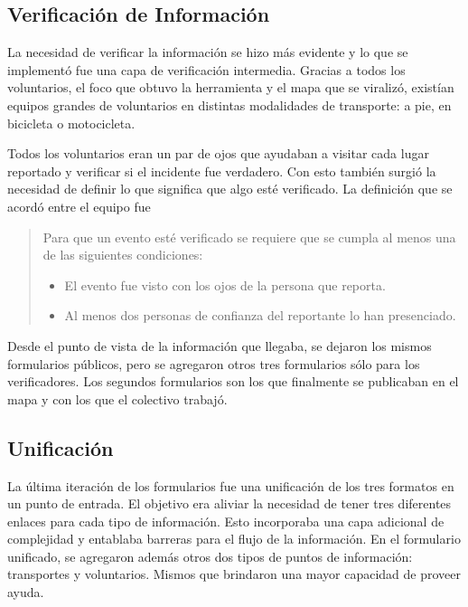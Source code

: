 \documentclass[12pt,spanish,oneside,breaklinks]{book}
\begin{document}
\subsection{Verificación de Información}
\label{sec:org77833d3}

La necesidad de verificar la información se hizo más evidente y lo que se implementó fue una capa de verificación intermedia. Gracias a todos los voluntarios, el foco que obtuvo la herramienta y el mapa que se viralizó, existían equipos grandes de voluntarios en distintas modalidades de transporte: a pie, en bicicleta o motocicleta.

Todos los voluntarios eran un par de ojos que ayudaban a visitar cada lugar reportado y verificar si el incidente fue verdadero. Con esto también surgió la necesidad de definir lo que significa que algo esté verificado. La definición que se acordó entre el equipo fue

\begin{quote}


Para que un evento esté verificado se requiere que se cumpla al menos una de las siguientes condiciones:

\begin{itemize}
\item El evento fue  visto con los ojos de la persona que reporta.
\item Al menos dos personas de confianza del reportante lo han presenciado.
\end{itemize}
\end{quote}

Desde el punto de vista de la información que llegaba, se dejaron los mismos formularios públicos, pero se agregaron otros tres formularios sólo para los verificadores. Los segundos formularios son los que finalmente se publicaban en el mapa y con los que el colectivo trabajó.

\subsection{Unificación}
\label{sec:org21dde91}

La última iteración de los formularios fue una unificación de los tres formatos en un punto de entrada.  El objetivo era aliviar la necesidad de tener tres diferentes enlaces para cada tipo de información. Esto incorporaba una capa adicional de complejidad y entablaba barreras para el flujo de la información. En el formulario unificado, se agregaron además otros dos tipos de puntos de información: transportes y voluntarios. Mismos que brindaron una mayor capacidad de proveer ayuda.
\end{document}
